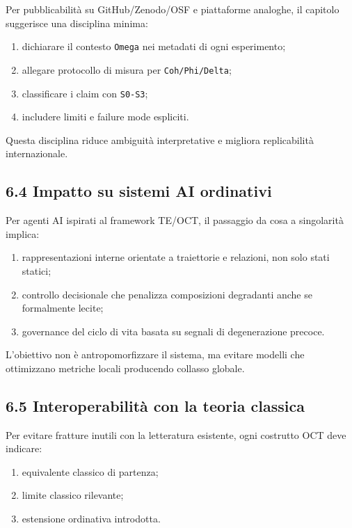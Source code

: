 Per pubblicabilità su GitHub/Zenodo/OSF e piattaforme analoghe, il capitolo suggerisce una disciplina minima:

\begin{enumerate}
\def\labelenumi{\arabic{enumi}.}
\tightlist
\item
  dichiarare il contesto \texttt{Omega} nei metadati di ogni esperimento;
\item
  allegare protocollo di misura per \texttt{Coh/Phi/Delta};
\item
  classificare i claim con \texttt{S0-S3};
\item
  includere limiti e failure mode espliciti.
\end{enumerate}

Questa disciplina riduce ambiguità interpretative e migliora replicabilità internazionale.

\subsection{6.4 Impatto su sistemi AI ordinativi}

Per agenti AI ispirati al framework TE/OCT, il passaggio da cosa a singolarità implica:

\begin{enumerate}
\def\labelenumi{\arabic{enumi}.}
\tightlist
\item
  rappresentazioni interne orientate a traiettorie e relazioni, non solo stati statici;
\item
  controllo decisionale che penalizza composizioni degradanti anche se formalmente lecite;
\item
  governance del ciclo di vita basata su segnali di degenerazione precoce.
\end{enumerate}

L'obiettivo non è antropomorfizzare il sistema, ma evitare modelli che ottimizzano metriche locali producendo collasso globale.

\subsection{6.5 Interoperabilità con la teoria classica}

Per evitare fratture inutili con la letteratura esistente, ogni costrutto OCT deve indicare:

\begin{enumerate}
\def\labelenumi{\arabic{enumi}.}
\tightlist
\item
  equivalente classico di partenza;
\item
  limite classico rilevante;
\item
  estensione ordinativa introdotta.
\end{enumerate}

